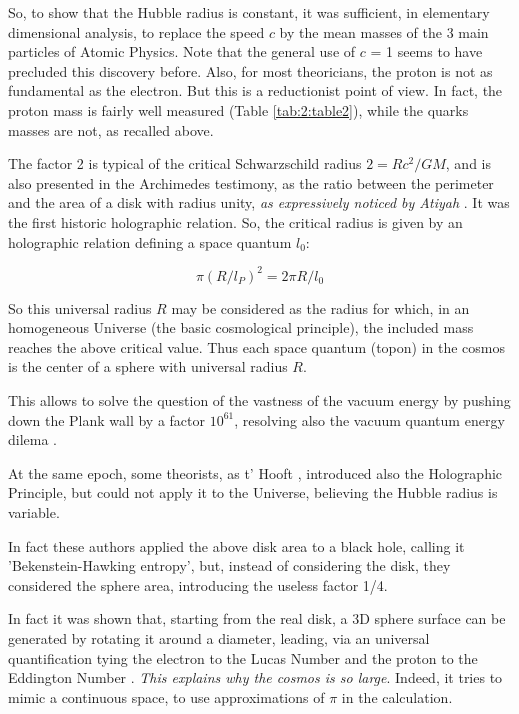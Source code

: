 \documentclass[a4paper,9pt]{article}
\begin{document}
So, to show that the Hubble radius is constant, it was sufficient, in elementary dimensional analysis, to replace the speed $c$ by the mean masses of the 3 main particles of Atomic Physics. Note that the general use of $c$ = 1 seems to have precluded this discovery before. Also, for most theoricians, the proton is not as fundamental as the electron. But this is a reductionist point of view. In fact, the proton mass is fairly well measured (Table \ref{tab:2:table2}), while the quarks masses are not, as recalled above.
 
 
    The factor 2 is typical of the critical Schwarzschild radius $2 = Rc^2/GM$, and is also presented in the Archimedes testimony, as the ratio between the perimeter and the area of a disk with radius unity, \textit {as expressively noticed by Atiyah }. It was the first historic holographic relation. So, the critical radius is given by an holographic relation defining a space quantum $l_0$:
    
    \begin{equation}
        \pi (R/l_P)^2 = 2\pi R/l_0
    \end{equation}
    
    So this universal radius $R$ may be considered as the radius for which, in an homogeneous Universe (the basic cosmological principle), the included mass reaches the above critical value\cite{Sanchez}. Thus each space quantum (topon) in the cosmos is the center of a sphere with universal radius $R$.  
    
    
    This allows to solve the question of the vastness of the vacuum energy by pushing down the Plank wall by a factor $10^61$, resolving also the vacuum quantum energy dilema  \cite{Sanchez} . 
    
    
    At the same epoch, some theorists, as t' Hooft \cite{Hooft}, introduced also the Holographic Principle, but could not apply it to the Universe, believing the Hubble radius is variable.
    
    
    In fact these authors applied the above disk area to a black hole, calling it 'Bekenstein-Hawking entropy'\cite{Bekenstein}, but, instead of considering the disk, they considered the sphere area, introducing the useless factor 1/4. 
    
    
    In fact it was shown that, starting from the real disk, a 3D sphere surface can be generated by rotating it around a diameter, leading, via an universal quantification tying the electron to the Lucas Number and the proton to the Eddington Number \cite{Sanchez}. \textit {This explains why the cosmos is so large}. Indeed, it tries to mimic a continuous space, to use approximations of $\pi$ in  the calculation.
    
\end{document}
